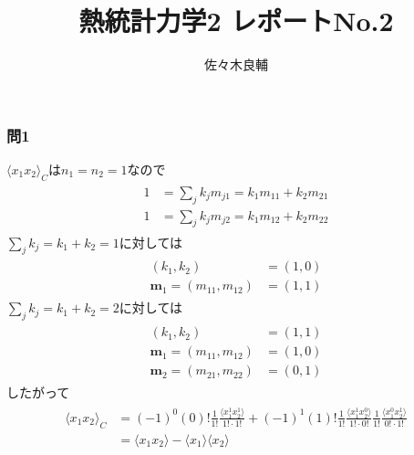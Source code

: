 \documentclass[uplatex,a4j,11pt,dvipdfmx]{jsarticle}
\begin{document}
\title{熱統計力学2 レポートNo.2}
\author{佐々木良輔}
\date{}
\maketitle
\subsubsection*{問1}
$\langle x_1x_2\rangle_C$は$n_1=n_2=1$なので
\begin{align}
  \begin{split}
    1&=\sum_jk_jm_{j1}=k_1m_{11}+k_2m_{21}\\
    1&=\sum_jk_jm_{j2}=k_1m_{12}+k_2m_{22}
  \end{split}
\end{align}
$\sum_jk_j=k_1+k_2=1$に対しては
\begin{align}
  \begin{split}
    (k_1,k_2)&=(1,0)\\
    {\bm m}_1=(m_{11},m_{12})&=(1,1)
  \end{split}
\end{align}
$\sum_jk_j=k_1+k_2=2$に対しては
\begin{align}
  \begin{split}
    (k_1,k_2)&=(1,1)\\
    {\bm m}_1=(m_{11},m_{12})&=(1,0)\\
    {\bm m}_2=(m_{21},m_{22})&=(0,1)
  \end{split}
\end{align}
したがって
\begin{align}
  \begin{split}
    \langle x_1x_2\rangle_C&=(-1)^0(0)!\frac{1}{1!}\frac{\langle x_1^1x_2^1\rangle}{1!\cdot 1!}+(-1)^1(1)!\frac{1}{1!}\frac{\langle x_1^1x_2^0\rangle}{1!\cdot 0!}\frac{1}{1!}\frac{\langle x_1^0x_2^1\rangle}{0!\cdot 1!}\\
    &=\langle x_1x_2\rangle-\langle x_1\rangle\langle x_2\rangle
  \end{split}
\end{align}
\end{document}
